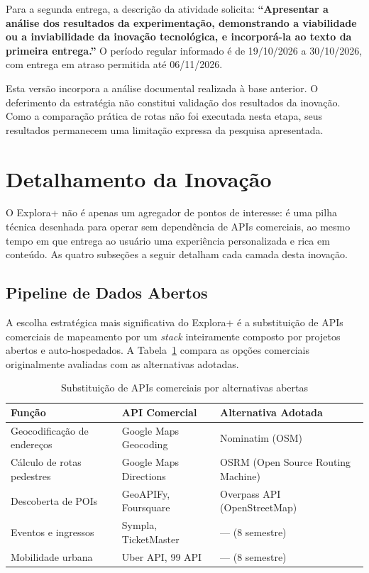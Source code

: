\documentclass[12pt, a4paper]{article}
\begin{document}
Para a segunda entrega, a descrição da atividade solicita: \textbf{“Apresentar a análise dos resultados da experimentação, demonstrando a viabilidade ou a inviabilidade da inovação tecnológica, e incorporá-la ao texto da primeira entrega.”} O período regular informado é de 19/10/2026 a 30/10/2026, com entrega em atraso permitida até 06/11/2026.

Esta versão incorpora a análise documental realizada à base anterior. O deferimento da estratégia não constitui validação dos resultados da inovação. Como a comparação prática de rotas não foi executada nesta etapa, seus resultados permanecem uma limitação expressa da pesquisa apresentada.
\clearpage
\section{Detalhamento da Inova\c{c}\~ao}

O Explora+ n\~ao \'e apenas um agregador de pontos de interesse: \'e uma pilha t\'ecnica desenhada para operar sem depend\^encia de APIs comerciais, ao mesmo tempo em que entrega ao usu\'ario uma experi\^encia personalizada e rica em conte\'udo. As quatro subse\c{c}\~oes a seguir detalham cada camada desta inova\c{c}\~ao.

\subsection{Pipeline de Dados Abertos}

A escolha estrat\'egica mais significativa do Explora+ \'e a substitui\c{c}\~ao de APIs comerciais de mapeamento por um \emph{stack} inteiramente composto por projetos abertos e auto-hospedados. A Tabela~\ref{tab:apis} compara as op\c{c}\~oes comerciais originalmente avaliadas com as alternativas adotadas.

\begin{table}[H]
\centering
\caption{Substitui\c{c}\~ao de APIs comerciais por alternativas abertas}
\label{tab:apis}
\small
\begin{tabular}{p{3.8cm}p{3.8cm}p{4.8cm}}
\toprule
\textbf{Fun\c{c}\~ao} & \textbf{API Comercial} & \textbf{Alternativa Adotada} \\
\midrule
Geocodifica\c{c}\~ao de endere\c{c}os & Google Maps Geocoding & Nominatim (OSM) \\
C\'alculo de rotas pedestres & Google Maps Directions & OSRM (Open Source Routing Machine) \\
Descoberta de POIs & GeoAPIFy, Foursquare & Overpass API (OpenStreetMap) \\
Eventos e ingressos & Sympla, TicketMaster & --- (8\textordmasculine{} semestre) \\
Mobilidade urbana & Uber API, 99 API & --- (8\textordmasculine{} semestre) \\
\bottomrule
\end{tabular}
\end{table}
\end{document}

